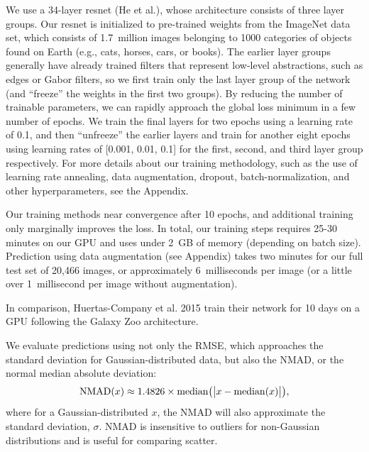 \documentclass[fleqn,usenatbib]{mnras}
\begin{document}
We use a 34-layer resnet (He et al.), whose architecture consists of three layer groups.
Our resnet is initialized to pre-trained weights from the ImageNet data set, which consists of 1.7~million images belonging to 1000 categories of objects found on Earth (e.g., cats, horses, cars, or books).
The earlier layer groups generally have already trained filters that represent low-level abstractions, such as edges or Gabor filters, so we first train only the last layer group of the network (and ``freeze'' the weights in the first two groups).
By reducing the number of trainable parameters, we can rapidly approach the global loss minimum in a few number of epochs.
We train the final layers for two epochs using a learning rate of 0.1, and then ``unfreeze'' the earlier layers and train for another eight epochs using learning rates of [0.001, 0.01, 0.1] for the first, second, and third layer group respectively.
For more details about our training methodology, such as the use of learning rate annealing, data augmentation, dropout, batch-normalization, and other hyperparameters, see the Appendix.

Our training methods near convergence after 10 epochs, and additional training only marginally improves the loss.
In total, our training steps requires 25-30 minutes on our GPU and uses under 2~GB of memory (depending on batch size).
Prediction using data augmentation (see Appendix) takes two minutes for our full test set of 20,466 images, or approximately 6~milliseconds per image (or a little over 1~millisecond per image without augmentation).


In comparison, Huertas-Company et al. 2015 train their network for 10 days on a GPU following the Galaxy Zoo architecture.


We evaluate predictions using not only the RMSE, which approaches the standard deviation for Gaussian-distributed data, but also the NMAD, or the normal median absolute deviation:
\begin{equation}
{\rm NMAD}(x) \approx 1.4826 \times {\rm median} \big (\big|x - {\rm median }(x) \big|\big ),
\end{equation}
where for a Gaussian-distributed $x$, the NMAD will also approximate the standard deviation, $\sigma$.
NMAD is insensitive to outliers for non-Gaussian distributions and is useful for comparing scatter.
\end{document}
